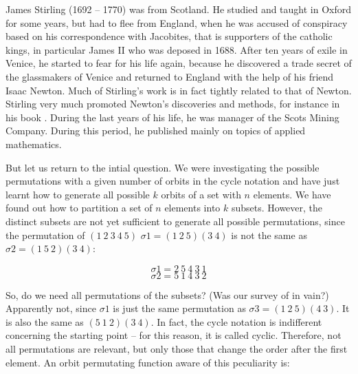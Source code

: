 \documentclass{scrreprt}
\begin{document}
James Stirling (1692 -- 1770) was from Scotland.
He studied and taught in Oxford for some years, but had to
flee from England, when he was accused of conspiracy
based on his correspondence with Jacobites, 
that is supporters of the catholic kings, 
in particular James II who was deposed in 1688.
After ten years of exile in Venice,
he started to fear for his life again, because
he discovered a trade secret of the glassmakers of Venice
and returned to England with the help of his friend
Isaac Newton. Much of Stirling's work
is in fact tightly related to that of Newton.
Stirling very much promoted Newton's discoveries and methods,
for instance
in his book .
During the last years of his life,
he was manager of the Scots Mining Company.
During this period, he published mainly on topics
of applied mathematics.

But let us return to the intial question.
We were investigating the possible permutations
with a given number of orbits in the cycle notation
and have just learnt how to generate all possible $k$ orbits
of a set with $n$ elements.
We have found out how to partition 
a set of $n$ elements into $k$ subsets.
However, the distinct subsets are not yet sufficient
to generate all possible permutations,
since the permutation of $(1~2~3~4~5)$
$\sigma1 = (1~2~5) (3~4)$
is not the same as $\sigma2 = (1~5~2) (3~4)$:

\[
\sigma1 = 2~5~4~3~1
\]
\[
\sigma2 = 5~1~4~3~2
\]

So, do we need all permutations of the subsets?
(Was our survey of  in vain?)
Apparently not, since $\sigma1$ is just the same
permutation as $\sigma3 = (1~2~5) (4~3)$.
It is also the same as $(5~1~2) (3~4)$.
In fact, the cycle notation is indifferent
concerning the starting point -- for this reason, it is called cyclic.
Therefore, not all permutations are relevant,
but only those that change the order after the first element.
An orbit permutating function aware of this peculiarity is:
\end{document}
